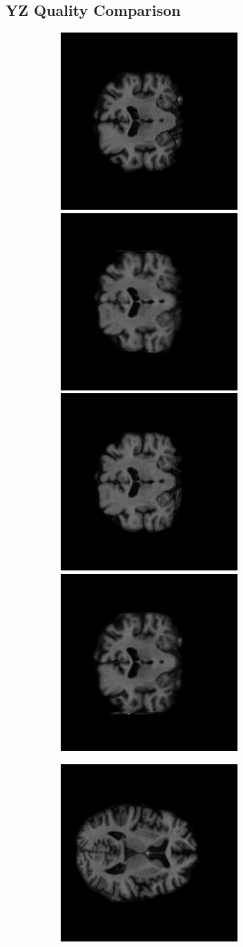 \documentclass[12pt, fleqn, titlepage]{article}
\newcommand\skipper{1.4pt}
\newcommand\ripper{2.5pt}
\begin{document}
\subsection{YZ Quality Comparison}\label{yz_generated}
\begin{figure}[H]
	\centering
	\begin{subfigure}[b]{0.7\textwidth}
		\centering
		\includegraphics[width=0.22\linewidth]{imgs/136_S_0196/136_S_0196_xy_3_GT}
		\hskip\skipper
		\includegraphics[width=0.22\linewidth]{imgs/136_S_0196/YZ_model_136_S_0196_xy_1.5}
		\hskip\skipper
		\includegraphics[width=0.22\linewidth]{imgs/136_S_0196/136_S_0196_xy_1.5_GT}
		\hskip\skipper
		\includegraphics[width=0.22\linewidth]{imgs/136_S_0196/YZ_model_136_S_0196_xy_3}
	\end{subfigure}
	\vskip\ripper
	\begin{subfigure}[b]{0.7\textwidth}
		\centering
		\includegraphics[width=0.22\linewidth]{imgs/136_S_0196/136_S_0196_xz_3_GT}

\end{subfigure}
\end{figure}
\end{document}
